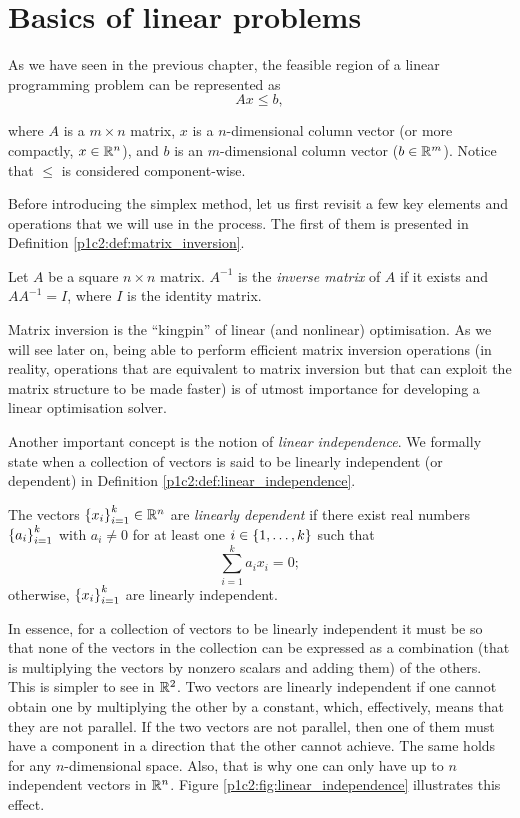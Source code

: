 \section{Basics of linear problems}

As we have seen in the previous chapter, the feasible region of a linear programming problem can be represented as
%
\begin{equation} \label{p1c2:eq:feasible_region_inequality}
	Ax \leq b,	
\end{equation}

where $A$ is a $m \times n$ matrix, $x$ is a $n$-dimensional column vector (or more compactly, $x \in \mathbb{R}^n$), and $b$ is an $m$-dimensional column vector ($b \in \mathbb{R}^m$). Notice that $\leq$ is considered component-wise.

Before introducing the simplex method, let us first revisit a few key elements and operations that we will use in the process. The first of them is presented in Definition \ref{p1c2:def:matrix_inversion}.
%
\begin{definition} \label{p1c2:def:matrix_inversion}
	Let $A$ be a square $n \times n$ matrix. $A^{-1}$ is the \emph{inverse matrix} of $A$ if it exists and $AA^{-1} = I$, where $I$ is the identity matrix.
\end{definition}
%
Matrix inversion is the ``kingpin'' of linear (and nonlinear) optimisation. As we will see later on, being able to perform efficient matrix inversion operations (in reality, operations that are equivalent to matrix inversion but that can exploit the matrix structure to be made faster) is of utmost importance for developing a linear optimisation solver. 

Another important concept is the notion of \emph{linear independence}. We formally state when a collection of vectors is said to be linearly independent (or dependent) in Definition \ref{p1c2:def:linear_independence}. 

%
\begin{definition} \label{p1c2:def:linear_independence}
	The vectors $\left\{ x_i \right \}_{i=1}^k \in \mathbb{R}^n$  are \emph{linearly dependent} if there exist real numbers $\left\{ a_i \right \}_{i=1}^k$ with $a_i \neq 0$ for at least one $i \in \left\{ 1,\dots, k \right \}$ such that
	$$
		\sum_{i=1}^k a_i x_i= 0;
	$$
	otherwise, $\left\{ x_i \right \}_{i=1}^k$ are linearly independent.
\end{definition}

In essence, for a collection of vectors to be linearly independent it must be so that none of the vectors in the collection can be expressed as a combination (that is multiplying the vectors by nonzero scalars and adding them) of the others. This is simpler to see in $\mathbb{R}^2$. Two vectors are linearly independent if one cannot obtain one by multiplying the other by a constant, which, effectively, means that they are not parallel. If the two vectors are not parallel, then one of them must have a component in a direction that the other cannot achieve. The same holds for any $n$-dimensional space. Also, that is why one can only have up to $n$ independent vectors in $\mathbb{R}^n$. Figure \ref{p1c2:fig:linear_independence} illustrates this effect. 


